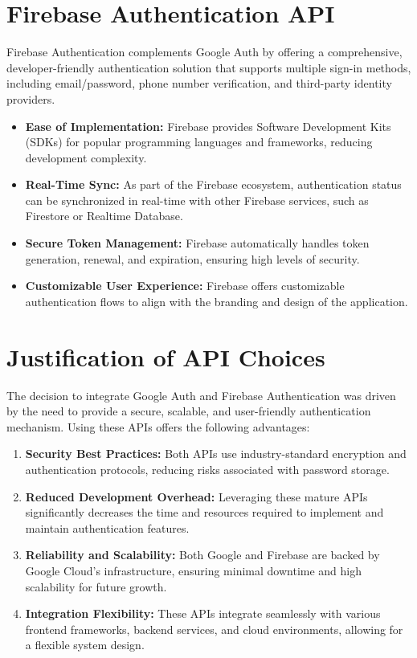 \section{Firebase Authentication API}
Firebase Authentication complements Google Auth by offering a comprehensive, developer-friendly authentication solution that supports multiple sign-in methods, including email/password, phone number verification, and third-party identity providers.
\begin{itemize}
    \item \textbf{Ease of Implementation:} Firebase provides Software Development Kits (SDKs) for popular programming languages and frameworks, reducing development complexity.
    \item \textbf{Real-Time Sync:} As part of the Firebase ecosystem, authentication status can be synchronized in real-time with other Firebase services, such as Firestore or Realtime Database.
    \item \textbf{Secure Token Management:} Firebase automatically handles token generation, renewal, and expiration, ensuring high levels of security.
    \item \textbf{Customizable User Experience:} Firebase offers customizable authentication flows to align with the branding and design of the application.
\end{itemize}

\section{Justification of API Choices}
The decision to integrate Google Auth and Firebase Authentication was driven by the need to provide a secure, scalable, and user-friendly authentication mechanism. Using these APIs offers the following advantages:
\begin{enumerate}
    \item \textbf{Security Best Practices:} Both APIs use industry-standard encryption and authentication protocols, reducing risks associated with password storage.
    \item \textbf{Reduced Development Overhead:} Leveraging these mature APIs significantly decreases the time and resources required to implement and maintain authentication features.
    \item \textbf{Reliability and Scalability:} Both Google and Firebase are backed by Google Cloud’s infrastructure, ensuring minimal downtime and high scalability for future growth.
    \item \textbf{Integration Flexibility:} These APIs integrate seamlessly with various frontend frameworks, backend services, and cloud environments, allowing for a flexible system design.
\end{enumerate}


